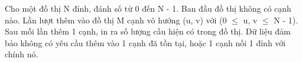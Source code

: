 Cho một đồ thị N đỉnh, đánh số từ 0 đến N - 1. Ban đầu đồ thị không có cạnh nào. Lần lượt thêm vào đồ thị M cạnh vô hướng (u, v) với (0  $\le$  u, v  $\le$  N - 1). Sau mỗi lần thêm 1 cạnh, in ra số lượng cầu hiện có trong đồ thị. Dữ liệu đảm bảo không có yêu cầu thêm vào 1 cạnh đã tồn tại, hoặc 1 cạnh nối 1 đỉnh với chính nó.